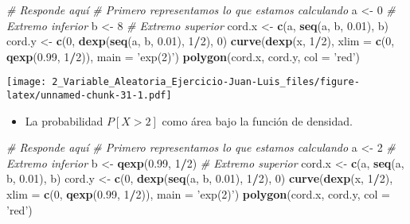 \documentclass[
]{article}
\newenvironment{Shaded}{\begin{snugshade}}{\end{snugshade}}
\newcommand{\CommentTok}[1]{\textcolor[rgb]{0.56,0.35,0.01}{\textit{#1}}}
\newcommand{\DataTypeTok}[1]{\textcolor[rgb]{0.13,0.29,0.53}{#1}}
\newcommand{\DecValTok}[1]{\textcolor[rgb]{0.00,0.00,0.81}{#1}}
\newcommand{\FloatTok}[1]{\textcolor[rgb]{0.00,0.00,0.81}{#1}}
\newcommand{\KeywordTok}[1]{\textcolor[rgb]{0.13,0.29,0.53}{\textbf{#1}}}
\newcommand{\NormalTok}[1]{#1}
\newcommand{\OperatorTok}[1]{\textcolor[rgb]{0.81,0.36,0.00}{\textbf{#1}}}
\newcommand{\StringTok}[1]{\textcolor[rgb]{0.31,0.60,0.02}{#1}}
\providecommand{\tightlist}{%
  \setlength{\itemsep}{0pt}\setlength{\parskip}{0pt}}
\begin{document}
\begin{Shaded}
\begin{Highlighting}[]
\CommentTok{# Responde aquí}
\CommentTok{# Primero representamos lo que estamos calculando}
\NormalTok{a <-}\StringTok{ }\DecValTok{0} \CommentTok{# Extremo inferior}
\NormalTok{b <-}\StringTok{ }\DecValTok{8} \CommentTok{# Extremo superior}
\NormalTok{cord.x <-}\StringTok{ }\KeywordTok{c}\NormalTok{(a, }\KeywordTok{seq}\NormalTok{(a, b, }\FloatTok{0.01}\NormalTok{), b) }
\NormalTok{cord.y <-}\StringTok{ }\KeywordTok{c}\NormalTok{(}\DecValTok{0}\NormalTok{, }\KeywordTok{dexp}\NormalTok{(}\KeywordTok{seq}\NormalTok{(a, b, }\FloatTok{0.01}\NormalTok{), }\DecValTok{1}\OperatorTok{/}\DecValTok{2}\NormalTok{), }\DecValTok{0}\NormalTok{) }
\KeywordTok{curve}\NormalTok{(}\KeywordTok{dexp}\NormalTok{(x, }\DecValTok{1}\OperatorTok{/}\DecValTok{2}\NormalTok{), }\DataTypeTok{xlim =} \KeywordTok{c}\NormalTok{(}\DecValTok{0}\NormalTok{, }\KeywordTok{qexp}\NormalTok{(}\FloatTok{0.99}\NormalTok{, }\DecValTok{1}\OperatorTok{/}\DecValTok{2}\NormalTok{)), }\DataTypeTok{main =} \StringTok{'exp(2)'}\NormalTok{)}
\KeywordTok{polygon}\NormalTok{(cord.x, cord.y, }\DataTypeTok{col =} \StringTok{'red'}\NormalTok{)}
\end{Highlighting}
\end{Shaded}

\texttt{[image: 2\_Variable\_Aleatoria\_Ejercicio-Juan-Luis\_files/figure-latex/unnamed-chunk-31-1.pdf]}

\begin{itemize}
\tightlist
\item
  La probabilidad \(P [X > 2]\) como área bajo la función de densidad.
\end{itemize}

\begin{Shaded}
\begin{Highlighting}[]
\CommentTok{# Responde aquí}
\CommentTok{# Primero representamos lo que estamos calculando}
\NormalTok{a <-}\StringTok{ }\DecValTok{2} \CommentTok{# Extremo inferior}
\NormalTok{b <-}\StringTok{ }\KeywordTok{qexp}\NormalTok{(}\FloatTok{0.99}\NormalTok{, }\DecValTok{1}\OperatorTok{/}\DecValTok{2}\NormalTok{) }\CommentTok{# Extremo superior}
\NormalTok{cord.x <-}\StringTok{ }\KeywordTok{c}\NormalTok{(a, }\KeywordTok{seq}\NormalTok{(a, b, }\FloatTok{0.01}\NormalTok{), b) }
\NormalTok{cord.y <-}\StringTok{ }\KeywordTok{c}\NormalTok{(}\DecValTok{0}\NormalTok{, }\KeywordTok{dexp}\NormalTok{(}\KeywordTok{seq}\NormalTok{(a, b, }\FloatTok{0.01}\NormalTok{), }\DecValTok{1}\OperatorTok{/}\DecValTok{2}\NormalTok{), }\DecValTok{0}\NormalTok{) }
\KeywordTok{curve}\NormalTok{(}\KeywordTok{dexp}\NormalTok{(x, }\DecValTok{1}\OperatorTok{/}\DecValTok{2}\NormalTok{), }\DataTypeTok{xlim =} \KeywordTok{c}\NormalTok{(}\DecValTok{0}\NormalTok{, }\KeywordTok{qexp}\NormalTok{(}\FloatTok{0.99}\NormalTok{, }\DecValTok{1}\OperatorTok{/}\DecValTok{2}\NormalTok{)), }\DataTypeTok{main =} \StringTok{'exp(2)'}\NormalTok{)}
\KeywordTok{polygon}\NormalTok{(cord.x, cord.y, }\DataTypeTok{col =} \StringTok{'red'}\NormalTok{)}
\end{Highlighting}
\end{Shaded}
\end{document}
